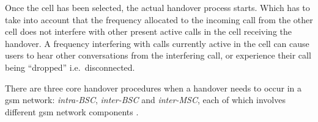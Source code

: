 Once the cell has been selected, the actual handover process starts. Which has to take into account that the frequency allocated to the incoming call from the other cell does not interfere with other present active calls in the cell receiving the handover\cite{Eisenblatter,GSMArchitectureProtocolsServices,wirelesstelcoMullet}. A frequency interfering with calls currently active in the cell can cause users to hear other conversations from the interfering call, or experience their call being ``dropped'' i.e.\ disconnected\cite{Eisenblatter}. 

There are three core handover procedures when a handover needs to occur in a \gls{gsm} network: \emph{intra-BSC}, \emph{inter-BSC} and \emph{inter-MSC}, each of which involves different \gls{gsm} network components \cite{wirelesstelcoMullet}.

